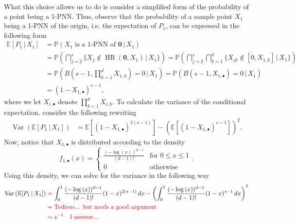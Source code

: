 \documentclass[letterpaper,10pt]{article}
\numberwithin{equation}{section}
\numberwithin{thm}{section}
\newcommand{\1}{\mathbb{1}}
\begin{document}
What this choice allows us to do is consider a simplified form of the probability of a point being a 1-PNN.
Thus, observe that the probability of a sample point $X_1$ being a 1-PNN of the origin, i.e. the expectation of $P_1$, can be expressed in the following form
\begin{equation*}
	\begin{aligned}
		\mathbb{E}[P_1 \, | \, X_1]
		 & = \mathbb{P}(X_1 \text{ is a 1-PNN of } \mathbf{0} \, | \, X_1)                                            \\
		 & = \mathbb{P}\left(\bigcap_{j = 2}^{s} \{X_j \not\in \operatorname{HR}(\mathbf{0}, X_1)\, | \, X_1\}\right)
		= \mathbb{P}\left(\bigcap_{j = 2}^{s}\bigcap_{k = 1}^{d} \{X_{jk} \not\in [0, X_{1,k}]\, | \, X_1\}\right)    \\
		 & = \mathbb{P}\left(B\left(s - 1, \prod_{k = 1}^{d} X_{1,k}\right) = 0\, | \, X_1\right)
		= \mathbb{P}\left(B\left(s - 1, X_{1, \bullet}\right) = 0\, | \, X_1\right)                                   \\
		 & = (1-X_{1, \bullet})^{s-1},
	\end{aligned}
\end{equation*}
where we let $X_{i,\bullet}$ denote $\prod_{k = 1}^{d} X_{i,k}$.
To calculate the variance of the conditional expectation, consider the following rewriting
\begin{equation*}
	\begin{aligned}
		\operatorname{Var}\left(\mathbb{E}[P_1 \, | \, X_1]\right)
		 & = \mathbb{E}[(1-X_{1, \bullet})^{2(s-1)}] - \left(\mathbb{E}[(1-X_{1, \bullet})^{s-1}]\right)^2.
	\end{aligned}
\end{equation*}
Now, notice that $X_{1,\bullet}$ is distributed according to the density
\begin{equation*}
	f_{1, \bullet}(x) = \begin{cases}
		\frac{(-\log{(x)})^{d-1}}{(d-1)!} & \text{for } 0\leq x \leq 1 \\
		0                                 & \text{otherwise}
	\end{cases}.
\end{equation*}
Using this density, we can solve for the variance in the following way
\begin{equation*}
	\begin{aligned}
		\operatorname{Var}\left(\mathbb{E}[P_1 \, | \, X_1]\right)
		 & = \int_{0}^{1} \frac{(-\log{(x)})^{d-1}}{(d-1)!} (1-x)^{2(s-1)} \, dx - \left(\int_{0}^{1} \frac{(-\log{(x)})^{d-1}}{(d-1)!}(1-x)^{s-1} \, dx\right)^2 \\
		 & = {\color{red}\text{Tedious... but needs a good argument}}                                                                                             \\
		 & \sim s^{-1} \quad {\color{red} \text{I assume...}}
	\end{aligned}
\end{equation*}
\end{document}
